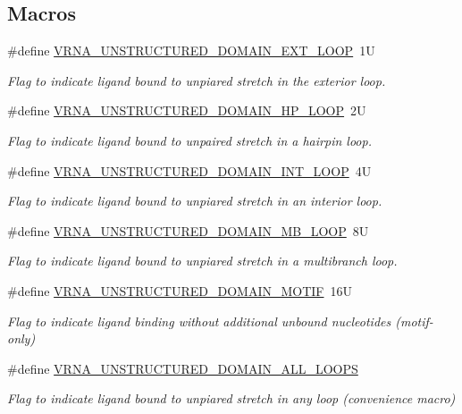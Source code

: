 \subsection*{Macros}
\begin{DoxyCompactItemize}
\item 
\#define \mbox{\hyperlink{group__domains__up_gaac911374e86236a51bfd42e1f098eaba}{V\+R\+N\+A\+\_\+\+U\+N\+S\+T\+R\+U\+C\+T\+U\+R\+E\+D\+\_\+\+D\+O\+M\+A\+I\+N\+\_\+\+E\+X\+T\+\_\+\+L\+O\+OP}}~1U
\begin{DoxyCompactList}\small\item\em Flag to indicate ligand bound to unpiared stretch in the exterior loop. \end{DoxyCompactList}\item 
\#define \mbox{\hyperlink{group__domains__up_ga23b610ea9564346c45cc1e2bbb62adf7}{V\+R\+N\+A\+\_\+\+U\+N\+S\+T\+R\+U\+C\+T\+U\+R\+E\+D\+\_\+\+D\+O\+M\+A\+I\+N\+\_\+\+H\+P\+\_\+\+L\+O\+OP}}~2U
\begin{DoxyCompactList}\small\item\em Flag to indicate ligand bound to unpaired stretch in a hairpin loop. \end{DoxyCompactList}\item 
\#define \mbox{\hyperlink{group__domains__up_gac4a0feccd9654c149203200248c2716b}{V\+R\+N\+A\+\_\+\+U\+N\+S\+T\+R\+U\+C\+T\+U\+R\+E\+D\+\_\+\+D\+O\+M\+A\+I\+N\+\_\+\+I\+N\+T\+\_\+\+L\+O\+OP}}~4U
\begin{DoxyCompactList}\small\item\em Flag to indicate ligand bound to unpiared stretch in an interior loop. \end{DoxyCompactList}\item 
\#define \mbox{\hyperlink{group__domains__up_ga67b80796655e5227a4ed662bfbe398b0}{V\+R\+N\+A\+\_\+\+U\+N\+S\+T\+R\+U\+C\+T\+U\+R\+E\+D\+\_\+\+D\+O\+M\+A\+I\+N\+\_\+\+M\+B\+\_\+\+L\+O\+OP}}~8U
\begin{DoxyCompactList}\small\item\em Flag to indicate ligand bound to unpiared stretch in a multibranch loop. \end{DoxyCompactList}\item 
\#define \mbox{\hyperlink{group__domains__up_gaab12b58d59be76446a9f76fad2fe624c}{V\+R\+N\+A\+\_\+\+U\+N\+S\+T\+R\+U\+C\+T\+U\+R\+E\+D\+\_\+\+D\+O\+M\+A\+I\+N\+\_\+\+M\+O\+T\+IF}}~16U
\begin{DoxyCompactList}\small\item\em Flag to indicate ligand binding without additional unbound nucleotides (motif-\/only) \end{DoxyCompactList}\item 
\#define \mbox{\hyperlink{group__domains__up_ga3c6be4cce70f1af9e885788856101699}{V\+R\+N\+A\+\_\+\+U\+N\+S\+T\+R\+U\+C\+T\+U\+R\+E\+D\+\_\+\+D\+O\+M\+A\+I\+N\+\_\+\+A\+L\+L\+\_\+\+L\+O\+O\+PS}}
\begin{DoxyCompactList}\small\item\em Flag to indicate ligand bound to unpiared stretch in any loop (convenience macro) \end{DoxyCompactList}\end{DoxyCompactItemize}
